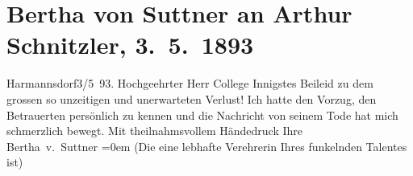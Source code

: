 

               \section[Bertha von Suttner an Arthur Schnitzler, 3. 5. 1893]{ Bertha von Suttner an Arthur Schnitzler, 3. 5. 1893}\nopagebreak{}\rehead{ }\begin{ledgroupsized}[t]{13cm}\normalsize\beginnumbering{} \toendnotes[C]{\smallbreak\pagebreak[2]} 
\toendnotes[C]{\smallbreak}\pstart
           \noindent{}{\pb}\textcolor{gray}{\textbf{\label{T_L00210-1v}\label{T_L00210-1h}}}\hfill Harmannsdorf3/5 93.\pend
           \pstart{}Hochgeehrter Herr College\pend\pstart
           Innigstes Beileid zu dem grossen so unzeitigen und unerwarteten Verlust! Ich
                    hatte den Vorzug, den Betrauerten persönlich zu kennen und die Nachricht von seinem Tode hat
                    mich schmerzlich bewegt. Mit theilnahms{\pb}vollem Händedruck\pend
           \pstart
           Ihre{\\[\baselineskip]}\spacefill\mbox{Bertha v. Suttner}\pend
           \leftskip=0em{}\pstart
           \noindent{}(Die eine lebhafte Verehrerin Ihres funkelnden Talentes ist)\pend
                     \endnumbering{}\end{ledgroupsized}  \newcommand{\dateiname}{L00210}\newcommand{\titel}{Bertha von Suttner an Arthur Schnitzler, 3. 5. 1893}\newcommand{\editorInnen}{Martin Anton Müller und Gerd-Hermann Susen}
            \footnotesize
\begin{ledgroupsized}[t]{11.5cm}
\end{ledgroupsized}
         
      